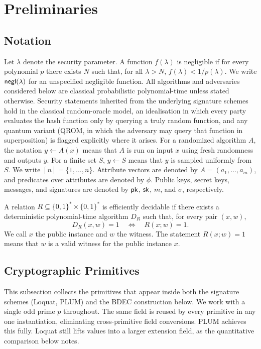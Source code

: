 \section{Preliminaries} \label{sec:prelim}
\subsection{Notation}
Let $\lambda$ denote the security parameter. A function $f(\lambda)$ is negligible if for every polynomial $p$ there exists $N$ such that, for all $\lambda>N$, $f(\lambda)<1/p(\lambda)$. We write $\mathsf{negl}(\lambda)$ for an unspecified negligible function. All algorithms and adversaries considered below are classical probabilistic polynomial-time unless stated otherwise. Security statements inherited from the underlying signature schemes hold in the classical random-oracle model, an idealisation in which every party evaluates the hash function only by querying a truly random function, and any quantum variant (QROM, in which the adversary may query that function in superposition) is flagged explicitly where it arises. For a randomized algorithm $A$, the notation $y\leftarrow A(x)$ means that $A$ is run on input $x$ using fresh randomness and outputs $y$. For a finite set $S$, $y\leftarrow S$ means that $y$ is sampled uniformly from $S$. We write $[n]=\{1,\ldots,n\}$. Attribute vectors are denoted by $A=(a_1,\ldots,a_m)$, and predicates over attributes are denoted by $\phi$. Public keys, secret keys, messages, and signatures are denoted by $\mathsf{pk}$, $\mathsf{sk}$, $m$, and $\sigma$, respectively.

\begin{definition}
A relation $R\subseteq\{0,1\}^\ast\times\{0,1\}^\ast$ is efficiently decidable if there exists a deterministic polynomial-time algorithm $D_R$ such that, for every pair $(x,w)$,
\begin{equation*}
  D_R(x,w)=1
  \quad\Longleftrightarrow\quad
  R(x;w)=1.
\end{equation*}
We call $x$ the public instance and $w$ the witness. The statement $R(x;w)=1$ means that $w$ is a valid witness for the public instance $x$.
\end{definition}

\subsection{Cryptographic Primitives}
This subsection collects the primitives that appear inside both the signature schemes (Loquat, PLUM) and the BDEC construction below. We work with a single odd prime $p$ throughout. The same field is reused by every primitive in any one instantiation, eliminating cross-primitive field conversions. PLUM achieves this fully. Loquat still lifts values into a larger extension field, as the quantitative comparison below notes.

